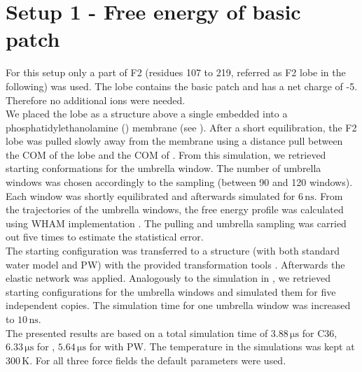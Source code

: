 \section{Setup 1 - Free energy of basic patch}
\label{setup:setup1}
For this setup only a part of F2 (residues 107 to 219, referred as F2 lobe in the following) was used. The lobe contains the basic patch and has a net charge of -5. Therefore no additional ions were needed.\\
We placed the lobe as a \charmm{} structure above a single \pip{} embedded into a phosphatidylethanolamine (\pope{}) membrane (see ). After a short equilibration, the F2 lobe was pulled slowly away from the membrane using a distance pull between the COM of the lobe and the COM of \pip{}. From this simulation, we retrieved starting conformations for the umbrella window. The number of umbrella windows was chosen accordingly to the sampling (between 90 and 120 windows). Each window was shortly equilibrated and afterwards simulated for $6\,\si{\nano\second}$.  From the trajectories of the umbrella windows, the free energy profile was calculated using \gromacs{} WHAM implementation \autocite{gromacsWHAM}. The pulling and umbrella sampling was carried out five times to estimate the statistical error.\\
The starting configuration was transferred to a \martini{} structure (with both standard water model and PW) with the provided transformation tools \autocite{backwardpy}. Afterwards the elastic network was applied. Analogously to the simulation in \charmm{}, we retrieved starting configurations for the umbrella windows and simulated them for five independent copies. The simulation time for one umbrella window was increased to $10\,\si{\nano\second}$.\\
The presented results are based on a total simulation time of $3.88\,\si{\micro\second}$ for C36, $6.33\,\si{\micro\second}$ for \martini{}, $5.64\,\si{\micro\second}$ for \martini{} with PW. The temperature in the simulations was kept at $300\,\si{\kelvin}$. For all three force fields the default parameters were used.
%
%
%
